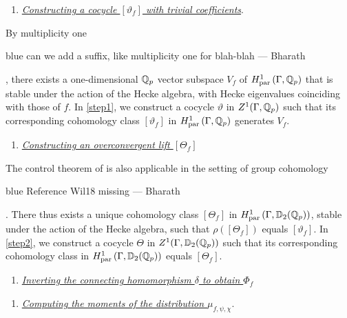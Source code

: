 \documentclass[a4paper,11pt]{article}
\newcommand{\BP}[1]{
	\begin{color}{blue}
		\marginpar{$\heartsuit$} #1
		--- Bharath
	\end{color}
}
\numberwithin{equation}{section}
\newcommand{\Par}{\mathrm{par}}
\begin{document}
\begin{enumerate}[style=sameline, style=sameline, align=left,label=(\textsc{Step 1}) --- , ref=(\textsc{Step 1})]
\item\label{step1} \underline{\emph{Constructing a cocycle $[\vartheta_{f}]$ with trivial coefficients}}.
\end{enumerate}
By multiplicity one \BP{can we add a suffix, like multiplicity one for blah-blah}, there exists a one-dimensional $\mathbb{Q}_p$ vector subspace $V_f$ of $H^1_{\Par}\left(\Gamma,\Q_p \right)$ that is stable under the action of the Hecke algebra, with Hecke eigenvalues coinciding with those of $f$. In \ref{step1}, we construct a cocycle $\vartheta$ in $Z^1(\Gamma,\mathbb{Q}_p)$ such that its corresponding cohomology class $[\vartheta_{f}]$ in $H^1_{\Par}\left(\Gamma,\Q_p \right)$ generates $V_f$.


\begin{enumerate}[style=sameline, style=sameline, align=left,label=(\textsc{Step 2}) --- , ref=(\textsc{Step 2})]
\item\label{step2} \underline{\emph{Constructing an overconvergent lift $[\Theta_{f}]$}}
\end{enumerate}

 The control theorem of \cite[Thm.~6.10]{Wil17} is also applicable in the setting of group cohomology \cite[Thm.~3.7]{Wil18} \BP{Reference Wil18 missing}. There thus exists a unique cohomology class $[\Theta_{f}]$ in $H^1_{\Par}\left(\Gamma,\D_2(\Q_p) \right)$, stable under the action of the Hecke algebra, such that $\rho([\Theta_{f}])$ equals $[\vartheta_{f}]$. In \ref{step2}, we construct a cocycle $\Theta$ in $Z^1(\Gamma,\mathbb{D}_2(\mathbb{Q}_p))$ such that its corresponding cohomology class in $H^1_{\Par}\left(\Gamma,\D_2(\Q_p) \right)$ equals $[\Theta_{f}]$.


\begin{enumerate}[style=sameline, style=sameline, align=left,label=(\textsc{Step 3}) --- , ref=(\textsc{Step 3})]
\item\label{step3} \underline{\emph{Inverting the connecting homomorphism $\delta$ to obtain $\Phi_{f}$}}
\end{enumerate}

\begin{enumerate}[style=sameline, style=sameline, align=left,label=(\textsc{Step 4}) --- , ref=(\textsc{Step 4})]
\item\label{step4} \underline{\emph{Computing the moments of the distribution $\mu_{f,\psi,\chi}$}}.
\end{enumerate}
\end{document}
